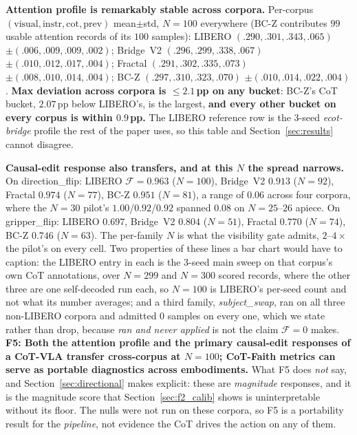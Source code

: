 \documentclass{article}
\begin{document}
\textbf{Attention profile is remarkably stable across corpora.} Per-corpus $(\text{visual}, \text{instr}, \text{cot}, \text{prev})$ mean$\pm$std, $N{=}100$ everywhere (BC-Z contributes $99$ usable attention records of its $100$ samples): LIBERO $(.290, .301, .343, .065)$ $\pm(.006, .009, .009, .002)$; Bridge~V2 $(.296, .299, .338, .067)$ $\pm(.010, .012, .017, .004)$; Fractal $(.291, .302, .335, .073)$ $\pm(.008, .010, .014, .004)$; BC-Z $(.297, .310, .323, .070)$ $\pm(.010, .014, .022, .004)$. \textbf{Max deviation across corpora is $\leq 2.1$\,pp on any bucket}: BC-Z's CoT bucket, $2.07$\,pp below LIBERO's, is the largest, \textbf{and every other bucket on every corpus is within $0.9$\,pp.} The LIBERO reference row is the 3-seed \emph{ecot-bridge} profile the rest of the paper uses, so this table and Section~\ref{sec:results} cannot disagree.

\textbf{Causal-edit response also transfers, and at this $N$ the spread narrows.} On direction\_flip: LIBERO $\mathcal{F}\!=\!0.963$ ($N{=}100$), Bridge~V2 $0.913$ ($N{=}92$), Fractal $0.974$ ($N{=}77$), BC-Z $0.951$ ($N{=}81$), a range of $0.06$ across four corpora, where the $N{=}30$ pilot's $1.00$/$0.92$/$0.92$ spanned $0.08$ on $N{=}25$--$26$ apiece. On gripper\_flip: LIBERO $0.697$, Bridge~V2 $0.804$ ($N{=}51$), Fractal $0.770$ ($N{=}74$), BC-Z $0.746$ ($N{=}63$). The per-family $N$ is what the visibility gate admits, $2$--$4\times$ the pilot's on every cell. Two properties of these lines a bar chart would have to caption: the LIBERO entry in each is the $3$-seed main sweep on that corpus's own CoT annotations, over $N{=}299$ and $N{=}300$ scored records, where the other three are one self-decoded run each, so $N{=}100$ is LIBERO's per-seed count and not what its number averages; and a third family, \emph{subject\_swap}, ran on all three non-LIBERO corpora and admitted $0$ samples on every one, which we state rather than drop, because \emph{ran and never applied} is not the claim $\mathcal{F}{=}0$ makes. \textbf{F5: Both the attention profile and the primary causal-edit responses of a CoT-VLA transfer cross-corpus at $N{=}100$; CoT-Faith metrics can serve as portable diagnostics across embodiments.} What F5 does \emph{not} say, and Section~\ref{sec:directional} makes explicit: these are \emph{magnitude} responses, and it is the magnitude score that Section~\ref{sec:f2_calib} shows is uninterpretable without its floor. The nulls were not run on these corpora, so F5 is a portability result for the \emph{pipeline}, not evidence the CoT drives the action on any of them.
\end{document}
